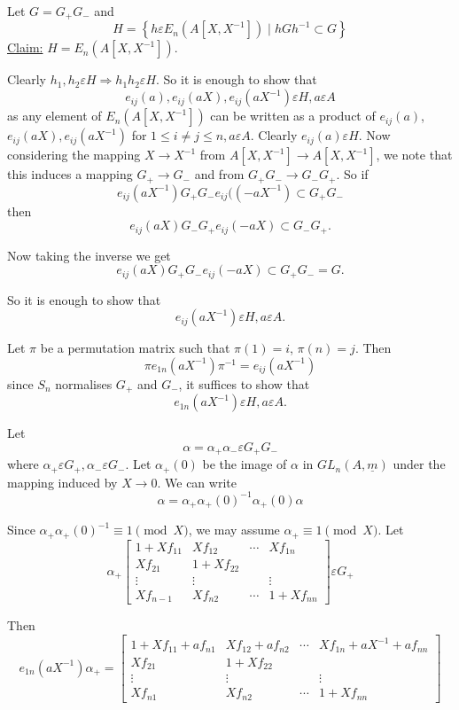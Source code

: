 \begin{Proof}
Let $G=G_+G_-$ and 
$$
H=\left\{h \varepsilon E_n\left(A\left[X,X^{-1}\right]\right)\mid
hGh^{-1}\subset G\right\}
$$
\underline{Claim:} $H=E_n\left(A\left[X,X^{-1}\right]\right)$.


Clearly $h_1,h_2\varepsilon H\Rightarrow h_1h_2\varepsilon H$. So it
is enough to show that 
$$
e_{ij}(a),e_{ij}(aX),e_{ij}\left(aX^{-1}\right)\varepsilon H,
a\varepsilon A
$$
as any element of $E_n\left(A\left[X,X^{-1}\right]\right)$ can be written
as a product of $e_{ij}(a)$, $e_{ij}(aX), e_{ij}\left(aX^{-1}\right)$
for $1\leq i\neq j\leq n, a\varepsilon A$. Clearly $e_{ij}(a)\varepsilon
H$. Now considering the mapping $X\rightarrow X^{-1}$ from
$A\left[X,X^{-1}\right]\rightarrow A\left[X,X^{-1}\right]$, we note
that this induces a mapping $G_+\rightarrow G_{-}$ and from
$G_+G_{-}\rightarrow G_{-}G_{+}$. So if 
$$
e_{ij}\left(aX^{-1}\right)G_+G_{-}e_{ij}(\left(-aX^{-1}\right)\subset G_+G_{-}
$$
then
$$
e_{ij}(aX)G_{-}G_{+}e_{ij}(-aX)\subset G_{-}G_+.
$$

Now taking the inverse we get
$$
e_{ij}(aX)G_{+}G_{-}e_{ij}(-aX)\subset G_{+}G_{-}=G.
$$

So it is enough to show that 
$$
e_{ij}\left(aX^{-1}\right)\varepsilon H, a\varepsilon A.
$$

Let $\pi$ be a permutation matrix such that $\pi(1)=i$,
$\pi(n)=j$. Then 
$$
\pi e_{1n}\left(aX^{-1}\right)\pi^{-1}=e_{ij}\left(aX^{-1}\right)
$$
since $S_n$ normalises $G_+$ and $G_{-}$, it suffices to show that 
$$
e_{1n}\left(aX^{-1}\right)\varepsilon H, a\varepsilon A.
$$

Let
$$
\alpha=\alpha_+\alpha_-\varepsilon G_+G_{-}
$$
where $\alpha_+\varepsilon G_+,\alpha_{-}\varepsilon G_{-}$. Let
$\alpha_+(0)$ be the image of $\alpha$ in $GL_n(A,\underline{m})$
under the mapping induced by $X\rightarrow 0$. We can write 
$$
\alpha=\alpha_+\alpha_+(0)^{-1}\alpha_+(0)\alpha
$$

Since $\alpha_+\alpha_+(0)^{-1}\equiv 1\pmod{X}$, we may assume
$\alpha_+\equiv 1\pmod{X}$. Let 
$$
\alpha_+
\begin{bmatrix}
1+Xf_{11} & Xf_{12}&\cdots &Xf_{1n}\\
Xf_{21} & 1+Xf_{22} &\\
\vdots & \vdots & &\vdots\\
Xf_{n-1} & Xf_{n2}&\cdots& 1+Xf_{nn}
\end{bmatrix} \varepsilon G_+
$$

Then 
{\fontsize{10}{12}\selectfont$$
e_{1n}\left(aX^{-1}\right)\alpha_+=
\begin{bmatrix}
1+Xf_{11}+af_{n1} & Xf_{12}+af_{n2}& \cdots &
Xf_{1n}+aX^{-1}+af_{nn}\\
Xf_{21} & 1+Xf_{22}&\\
\vdots & \vdots & &\vdots\\
Xf_{n1}& Xf_{n2}&\cdots & 1+Xf_{nn}
\end{bmatrix}
$$}


\end{Proof}
